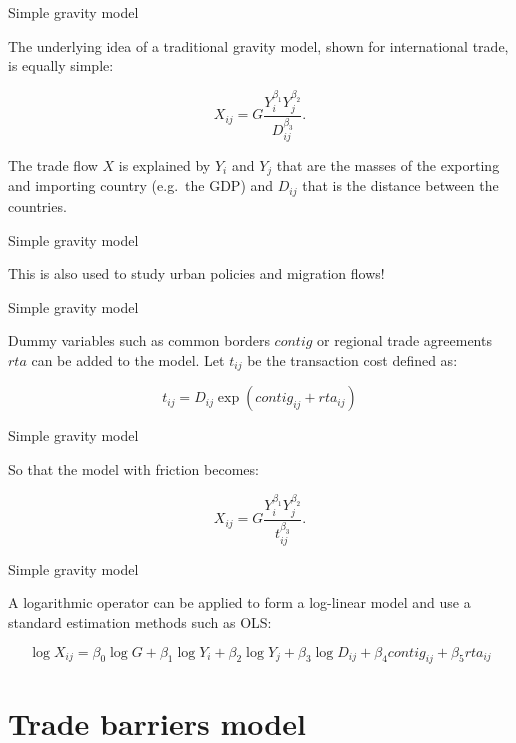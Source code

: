 \documentclass[ignorenonframetext,compress,aspectratio=169]{beamer}
\begin{document}
\begin{frame}{Simple gravity model}

The underlying idea of a traditional gravity model, shown for
international trade, is equally simple:

\[
X_{ij}=G\frac{Y_{i}^{\beta_{1}}Y_{j}^{\beta_{2}}}{D_{ij}^{\beta_{3}}}.
\]

The trade flow \(X\) is explained by \(Y_{i}\) and \(Y_{j}\) that are
the masses of the exporting and importing country (e.g.~the GDP) and
\(D_{ij}\) that is the distance between the countries.

\end{frame}

\begin{frame}{Simple gravity model}

\LARGE{This is also used to study urban policies and migration flows!}

\end{frame}

\begin{frame}{Simple gravity model}

Dummy variables such as common borders \(contig\) or regional trade
agreements \(rta\) can be added to the model. Let \(t_{ij}\) be the
transaction cost defined as:

\[
t_{ij}= D_{ij} \exp(contig_{ij} + rta_{ij})
\]

\end{frame}

\begin{frame}{Simple gravity model}

So that the model with friction becomes:

\[
X_{ij}=G\frac{Y_{i}^{\beta_{1}}Y_{j}^{\beta_{2}}}{t_{ij}^{\beta_{3}}}.
\]

\end{frame}

\begin{frame}{Simple gravity model}

A logarithmic operator can be applied to form a log-linear model and use
a standard estimation methods such as OLS:

\[
\log X_{ij}=\beta_{0}\log G +\beta_{1}\log Y_{i}+\beta_{2}\log Y_{j}+\beta_{3}\log D_{ij}+\beta_{4}contig_{ij}+\beta_{5}rta_{ij}
\]

\end{frame}

\section{Trade barriers model}\label{trade-barriers-model}
\end{document}
